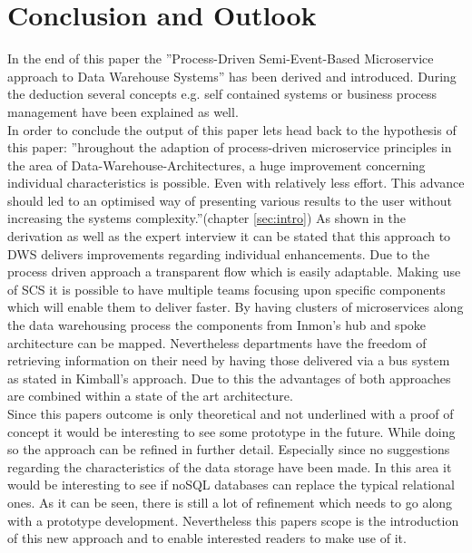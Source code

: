 \section{Conclusion and Outlook}
\label{sec:conclusion}
In the end of this paper the ''Process-Driven Semi-Event-Based Microservice approach to Data Warehouse Systems'' has been derived and introduced. During the deduction several concepts e.g. self contained systems or business process management have been explained as well. \newline
\\
In order to conclude the output of this paper lets head back to the hypothesis of this paper: ''hroughout the adaption of process-driven  microservice  principles  in  the  area  of  Data-Warehouse-Architectures,  a  huge improvement concerning individual characteristics is possible. Even with relatively less effort. This advance should led to an optimised way of presenting various results to the user without increasing the systems complexity.''(chapter \ref{sec:intro})
As shown in the derivation as well as the expert interview it can be stated that this approach to DWS delivers improvements regarding individual enhancements. Due to the process driven approach a transparent flow which is easily adaptable. Making use of SCS it is possible to have multiple teams focusing upon specific components which will enable them to deliver faster. By having clusters of microservices along the data warehousing process the components from Inmon's hub and spoke architecture can be mapped. Nevertheless departments have the freedom of retrieving information on their need by having those delivered via a bus system as stated in Kimball's approach.\newline
Due to this the advantages of both approaches are combined within a state of the art architecture. \newline
\\
Since this papers outcome is only theoretical and not underlined with a proof of concept it would be interesting to see some prototype in the future. While doing so the approach can be refined in further detail. Especially since no suggestions regarding the characteristics of the data storage have been made. In this area it would be interesting to see if noSQL databases can replace the typical relational ones. As it can be seen, there is still a lot of refinement which needs to go along with a prototype development. Nevertheless this papers scope is the introduction of this new approach and to enable interested readers to make use of it. 